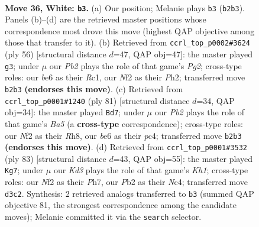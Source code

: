 \documentclass[11pt]{article}
\begin{document}
\clearpage

\begin{figure}[p]\centering
\begin{subfigure}{0.46\textwidth}\centering
\resizebox{\linewidth}{!}{%
\newchessgame
\chessboard[
  setfen={3r1k2/1p3p1p/4b3/p2p2r1/8/3K1BP1/PP3N1P/2R3R1 w - - 0 36},
  showmover=false,
  pgfstyle=straightmove, color=movearrow, markmove={b2-b3}
]}
\caption{}
\end{subfigure}\hfill
\begin{subfigure}{0.46\textwidth}\centering
\resizebox{\linewidth}{!}{%
\newchessgame
\chessboard[
  setfen={r6k/1p1rp1bp/1p4p1/3P4/4N3/5P2/P5PP/2RR2K1 w - - 0 29},
  showmover=false,
  pgfstyle=straightmove, color=movearrow, markmove={g2-g3}
]}
\caption{}
\end{subfigure}
\\[4pt]
\begin{subfigure}{0.46\textwidth}\centering
\resizebox{\linewidth}{!}{%
\newchessgame
\chessboard[
  setfen={3k3r/ppp5/8/4p2r/bPP3RP/P1B1P3/4K2R/8 b - - 9 41},
  showmover=false,
  pgfstyle=straightmove, color=movearrow, markmove={a4-d7}
]}
\caption{}
\end{subfigure}\hfill
\begin{subfigure}{0.46\textwidth}\centering
\resizebox{\linewidth}{!}{%
\newchessgame
\chessboard[
  setfen={2r2r1k/1p5p/3p1p2/1P6/2n1PRP1/3R3P/6B1/7K b - - 0 42},
  showmover=false,
  pgfstyle=straightmove, color=movearrow, markmove={h8-g7}
]}
\caption{}
\end{subfigure}
\caption{\textbf{Move 36, White: \texttt{b3}.} (a) Our position; Melanie plays \texttt{b3} (\texttt{b2b3}). Panels (b)--(d) are the retrieved master positions whose correspondence most drove this move (highest QAP objective among those that transfer to it). (b) Retrieved from \texttt{ccrl\_top\_p0002\#3624} (ply 56) [structural distance $d$=47, QAP obj=47]: the master played \texttt{g3}; under $\mu$ our \emph{Pb2} plays the role of that game's \emph{Pg2}; cross-type roles: our \emph{b}e6 as their \emph{R}c1, our \emph{N}f2 as their \emph{P}h2; transferred move \texttt{b2b3} \textbf{(endorses this move)}. (c) Retrieved from \texttt{ccrl\_top\_p0001\#1240} (ply 81) [structural distance $d$=34, QAP obj=34]: the master played \texttt{Bd7}; under $\mu$ our \emph{Pb2} plays the role of that game's \emph{Ba5} (a \textbf{cross-type} correspondence); cross-type roles: our \emph{N}f2 as their \emph{R}h8, our \emph{b}e6 as their \emph{p}c4; transferred move \texttt{b2b3} \textbf{(endorses this move)}. (d) Retrieved from \texttt{ccrl\_top\_p0001\#3532} (ply 83) [structural distance $d$=43, QAP obj=55]: the master played \texttt{Kg7}; under $\mu$ our \emph{Kd3} plays the role of that game's \emph{Kh1}; cross-type roles: our \emph{N}f2 as their \emph{P}h7, our \emph{P}b2 as their \emph{N}c4; transferred move \texttt{d3c2}. Synthesis: 2 retrieved analogs transferred to \texttt{b3} (summed QAP objective 81, the strongest correspondence among the candidate moves); Melanie committed it via the \texttt{search} selector.}
\label{fig:thought-m70}
\end{figure}
\end{document}
